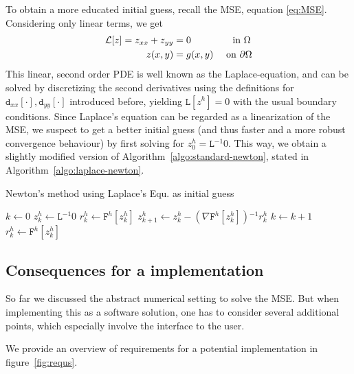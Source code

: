 \documentclass[11pt]{scrartcl}
\newcommand{\mSurfDisc}[1]{\ensuremath{\mathtt{F}^h\left[#1\right]}}
\newcommand{\Dxx}[1]{\ensuremath{\mathtt{d}_{xx}[#1]}}
\newcommand{\Dyy}[1]{\ensuremath{\mathtt{d}_{yy}[#1]}}
\newcommand{\inv}{\ensuremath{^{-1}}}
\begin{document}
To obtain a more educated initial guess, recall the MSE, equation \eqref{eq:MSE}. Considering only linear terms, we get 
\begin{align}
	\mathcal{L} [z] = z_{xx} + z_{yy} &= 0 \quad\quad\quad\quad \text{ in } \Omega \\
	z(x,y) &= g(x,y) \quad \text{ on } \partial\Omega \notag 
\end{align}\newpage
This linear, second order PDE is well known as the Laplace-equation, and can be solved by discretizing the second derivatives using the definitions for $\Dxx{\cdot},\Dyy{\cdot}$ introduced before, yielding $\mathtt{L}[z^h]=0 $ with the usual boundary conditions. Since Laplace's equation can be regarded as a linearization of the MSE, we suspect to get a better initial guess (and thus faster and a more robust convergence behaviour) by first solving for $z^h_0= \mathtt{L}\inv 0$. This way, we obtain a slightly modified version of Algorithm~\ref{algo:standard-newton}, stated in Algorithm~\ref{algo:laplace-newton}.

\begin{algorithm}
	\caption{Newton's method using Laplace's Equ. as initial guess}\label{algo:laplace-newton}
	\begin{algorithmic}
		\State $k \gets 0$ 
		\State $z^h_k \gets \mathtt{L}\inv 0 $ 
		\State $r^h_k \gets \mSurfDisc{z^h_k}$
		\State $z^h_{k+1} \gets z^h_{k} - \left(\nabla\mSurfDisc{z^h_k}\right)\inv r^h_k $
		\State $k \gets k+1$ 
		\State $r^h_k \gets \mSurfDisc{z^h_k}$
		\EndWhile
	\end{algorithmic}
\end{algorithm}

\clearpage
\subsection{Consequences for a implementation}
So far we discussed the abstract numerical setting to solve the MSE. But when implementing this as a software solution, one has to consider several additional points, which especially involve the interface to the user.

We provide an overview of requirements for a potential implementation in figure~\ref{fig:requs}.
\end{document}
